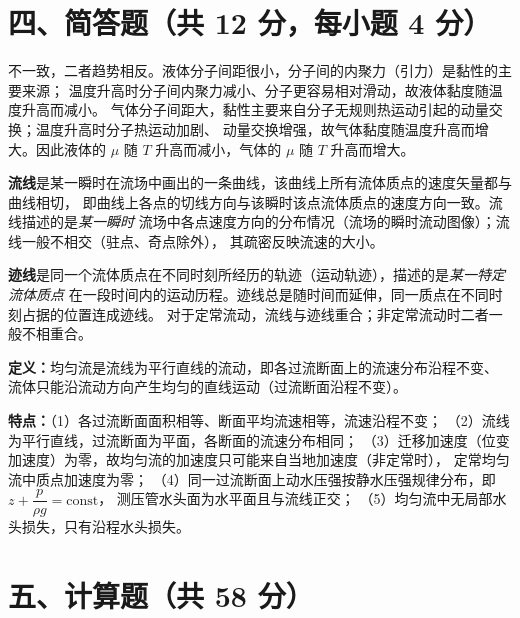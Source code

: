 \section{四、简答题（共 12 分，每小题 4 分）}


不一致，二者趋势相反。液体分子间距很小，分子间的内聚力（引力）是黏性的主要来源；
温度升高时分子间内聚力减小、分子更容易相对滑动，故液体黏度随温度升高而减小。
气体分子间距大，黏性主要来自分子无规则热运动引起的动量交换；温度升高时分子热运动加剧、
动量交换增强，故气体黏度随温度升高而增大。因此液体的 $\mu$ 随 $T$ 升高而减小，气体的 $\mu$ 随 $T$ 升高而增大。


\textbf{流线}是某一瞬时在流场中画出的一条曲线，该曲线上所有流体质点的速度矢量都与曲线相切，
即曲线上各点的切线方向与该瞬时该点流体质点的速度方向一致。流线描述的是\emph{某一瞬时}
流场中各点速度方向的分布情况（流场的瞬时流动图像）；流线一般不相交（驻点、奇点除外），
其疏密反映流速的大小。

\textbf{迹线}是同一个流体质点在不同时刻所经历的轨迹（运动轨迹），描述的是\emph{某一特定流体质点}
在一段时间内的运动历程。迹线总是随时间而延伸，同一质点在不同时刻占据的位置连成迹线。
对于定常流动，流线与迹线重合；非定常流动时二者一般不相重合。


\textbf{定义：}均匀流是流线为平行直线的流动，即各过流断面上的流速分布沿程不变、
流体只能沿流动方向产生均匀的直线运动（过流断面沿程不变）。

\textbf{特点：}（1）各过流断面面积相等、断面平均流速相等，流速沿程不变；
（2）流线为平行直线，过流断面为平面，各断面的流速分布相同；
（3）迁移加速度（位变加速度）为零，故均匀流的加速度只可能来自当地加速度（非定常时），
定常均匀流中质点加速度为零；
（4）同一过流断面上动水压强按静水压强规律分布，即 $z+\dfrac{p}{\rho g}=\text{const}$，
测压管水头面为水平面且与流线正交；
（5）均匀流中无局部水头损失，只有沿程水头损失。

\section{五、计算题（共 58 分）}


